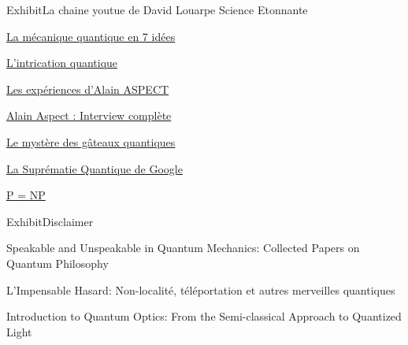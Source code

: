 \documentclass{beamer}
\begin{document}
\begin{frame}{Exhibit}{La chaine youtue de David Louarpe Science Etonnante}
  \begin{description}
  \item \href{https://www.youtube.com/watch?v=Rj3jTw2DxXQ&t=3s}{La mécanique quantique en 7 idées}
  \item \href{https://www.youtube.com/watch?v=5R6k2mEacZo&t=8s}{L'intrication quantique}
  \item \href{https://www.youtube.com/watch?v=hB1kmGzpIrw}{Les expériences d'Alain ASPECT}
  \item \href{https://www.youtube.com/watch?v=OeZ_63iKPho&t=556s}{Alain Aspect : Interview complète}
  \item \href{https://www.youtube.com/watch?v=hB1kmGzpIrw}{Le mystère des gâteaux quantiques}
  \item \href{https://www.youtube.com/watch?v=KaRd_eB2qOA}{La Suprématie Quantique de Google}
  \item \href{https://www.youtube.com/watch?v=AgtOCNCejQ8}{P = NP}
  \end{description}
\end{frame}

\begin{frame}{Exhibit}{Disclaimer}
  \begin{description}
  \item Speakable and Unspeakable in Quantum Mechanics: Collected Papers on Quantum Philosophy
  \item L'Impensable Hasard: Non-localité, téléportation et autres merveilles quantiques
  \item Introduction to Quantum Optics: From the Semi-classical Approach to Quantized Light
  \end{description}
\end{frame}
\end{document}
